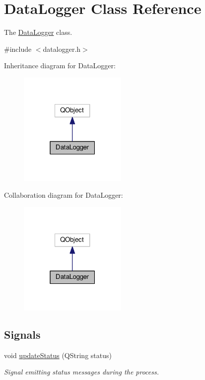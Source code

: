 \hypertarget{classDataLogger}{}\section{Data\+Logger Class Reference}
\label{classDataLogger}


The \hyperlink{classDataLogger}{Data\+Logger} class.  




{\ttfamily \#include $<$datalogger.\+h$>$}



Inheritance diagram for Data\+Logger\+:\nopagebreak
\begin{figure}[H]
\begin{center}
\leavevmode
\includegraphics[width=147pt]{classDataLogger__inherit__graph}
\end{center}
\end{figure}


Collaboration diagram for Data\+Logger\+:\nopagebreak
\begin{figure}[H]
\begin{center}
\leavevmode
\includegraphics[width=147pt]{classDataLogger__coll__graph}
\end{center}
\end{figure}
\subsection*{Signals}
\begin{DoxyCompactItemize}
\item 
void \hyperlink{classDataLogger_a59e42d6e77f7fd97ea23529abb6c275c}{update\+Status} (Q\+String status)
\begin{DoxyCompactList}\small\item\em Signal emitting status messages during the process. \end{DoxyCompactList}\end{DoxyCompactItemize}
